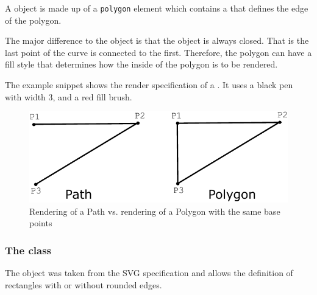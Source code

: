 A \Polygon object is made up of a \texttt{polygon} element which contains a 
\ListOfElements that defines the edge of the polygon.

The major difference to the \RenderCurve 
object is that the object is always closed. 
That is the last point of the curve is connected to the first.
Therefore, the polygon can have a fill style 
that determines how the inside of the polygon is to be rendered.

The example snippet shows the render specification of a \Polygon. It uses a 
black pen with width 3, and a red fill brush.

{\footnotesize
{}
}

\begin{figure}[!ht]
\begin{center}
\includegraphics[scale=0.10]{figures/PathVsPolygon}
\end{center}
\caption{Rendering of a Path vs. rendering of a Polygon with the same base points}
\label{PathVsPolygon}
\end{figure}



\subsubsection{The  class}
\label{renderrectangle-class}

The \RenderRectangle object was taken from the SVG specification and allows the 
definition of 
rectangles with or without rounded edges. 

